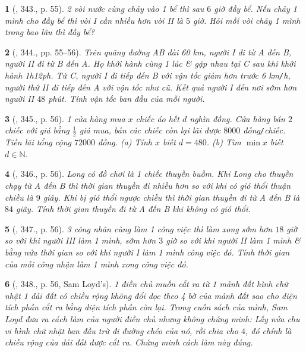 \documentclass{article}
\newtheorem{baitoan}{}
\begin{document}
\begin{baitoan}[\cite{Binh_Toan_9_tap_2}, 343., p. 55]
	2 vòi nước cùng chảy vào 1 bể thì sau $6$ giờ đầy bể. Nếu chảy 1 mình cho đầy bể thì vòi I cần nhiều hơn vòi II là $5$ giờ. Hỏi mỗi vòi chảy 1 mình trong bao lâu thì đầy bể?
\end{baitoan}

\begin{baitoan}[\cite{Binh_Toan_9_tap_2}, 344., pp. 55--56]
	Trên quãng đường AB dài {\rm60 km}, người I đi từ A đến B, người II đi từ B đến A. Họ khởi hành cùng 1 lúc \& gặp nhau tại C sau khi khởi hành {\rm1h12ph}. Từ C, người I đi tiếp đến B với vận tốc giảm hơn trước {\rm6 km{\tt/}h}, người thứ II đi tiếp đến A với vận tốc như cũ. Kết quả người I đến nơi sớm hơn người II $48$ phút. Tính vận tốc ban đầu của mỗi người.
\end{baitoan}

\begin{baitoan}[\cite{Binh_Toan_9_tap_2}, 345., p. 56]
	1 cửa hàng mua $x$ chiếc áo hết $d$ nghìn đồng. Cửa hàng bán $2$ chiếc với giá bằng $\frac{1}{2}$ giá mua, bán các chiếc còn lại lãi được $8000$ đồng{\tt/}chiếc. Tiền lãi tổng cộng $72000$ đồng. (a) Tính $x$ biết $d = 480$. (b) Tìm $\min x$ biết $d\in\mathbb{N}$.
\end{baitoan}

\begin{baitoan}[\cite{Binh_Toan_9_tap_2}, 346., p. 56]
	Long có đồ chơi là 1 chiếc thuyền buồm. Khi Long cho thuyền chạy từ A đến B thì thời gian thuyền đi nhiều hơn so với khi có gió thổi thuận chiều là $9$ giây. Khi bị gió thổi ngược chiều thì thời gian thuyền đi từ A đến B là $84$ giây. Tính thời gian thuyền đi từ A đến B khi không có gió thổi.
\end{baitoan}

\begin{baitoan}[\cite{Binh_Toan_9_tap_2}, 347., p. 56]
	3 công nhân cùng làm 1 công việc thì làm xong sớm hơn $18$ giờ so với khi người III làm 1 mình, sớm hơn $3$ giờ so với khi người II làm 1 mình \& bằng nửa thời gian so với khi người I làm 1 mình công việc đó. Tính thời gian của mỗi công nhận làm 1 mình xong công việc đó.
\end{baitoan}

\begin{baitoan}[\cite{Binh_Toan_9_tap_2}, 348., p. 56, Sam Loyd's]
	1 điền chủ muốn cắt ra từ 1 mảnh đất hình chữ nhật 1 dải đất có chiều rộng không đổi dọc theo 4 bờ của mảnh đất sao cho diện tích phần cắt ra bằng diện tích phần còn lại. Trong cuốn sách của mình, Sam Loyd đưa ra cách làm của người điền chủ nhưng không chứng minh: Lấy nửa chu vi hình chữ nhật ban đầu trừ đi đường chéo của nó, rồi chia cho $4$, đó chính là chiều rộng của dải đất được cắt ra. Chứng minh cách làm này đúng.
\end{baitoan}
\end{document}
